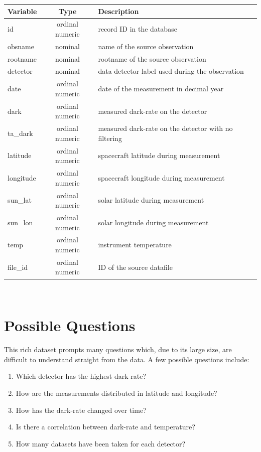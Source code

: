 \documentclass[a4paper,11pt]{article}
\begin{document}
\begin{center}
\begin{tabular}{| l | c | l | }
  \hline	
      Variable & Type & Description  \\  \hline \hline
      id & ordinal numeric & record ID in the database \\ \hline
      obsname & nominal & name of the source observation \\ \hline
      rootname & nominal & rootname of the source observation \\ \hline
      detector & nominal & data detector label used during the observation \\ \hline
      date & ordinal numeric & date of the measurement in decimal year \\ \hline
      dark & ordinal numeric & measured dark-rate on the detector \\ \hline
      ta\_dark & ordinal numeric & measured dark-rate on the detector with no filtering \\ \hline
      latitude & ordinal numeric & spacecraft latitude during measurement \\ \hline
      longitude & ordinal numeric & spacecraft longitude during measurement \\ \hline
      sun\_lat & ordinal numeric & solar latitude during measurement \\ \hline
      sun\_lon & ordinal numeric & solar longitude during measurement \\ \hline
      temp & ordinal numeric & instrument temperature\\ \hline
      file\_id & ordinal numeric & ID of the source datafile \\ \hline
\end{tabular} \\
\end{center}

\section{Possible Questions}
This rich dataset prompts many questions which, due to its large size, are difficult to understand straight from the data.  A few possible questions include:

\begin{enumerate}
  \item Which detector has the highest dark-rate?  
  \item How are the measurements distributed in latitude and longitude? 
  \item How has the dark-rate changed over time?  
  \item Is there a correlation between dark-rate and temperature? 
  \item How many datasets have been taken for each detector?
\end{enumerate}
\end{document}
